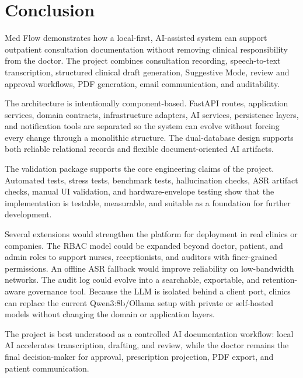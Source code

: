 \section{Conclusion}

Med Flow demonstrates how a local-first, AI-assisted system can support outpatient consultation documentation without removing clinical responsibility from the doctor. The project combines consultation recording, speech-to-text transcription, structured clinical draft generation, Suggestive Mode, review and approval workflows, PDF generation, email communication, and auditability.

The architecture is intentionally component-based. FastAPI routes, application services, domain contracts, infrastructure adapters, AI services, persistence layers, and notification tools are separated so the system can evolve without forcing every change through a monolithic structure. The dual-database design supports both reliable relational records and flexible document-oriented AI artifacts.

The validation package supports the core engineering claims of the project. Automated tests, stress tests, benchmark tests, hallucination checks, ASR artifact checks, manual UI validation, and hardware-envelope testing show that the implementation is testable, measurable, and suitable as a foundation for further development.

Several extensions would strengthen the platform for deployment in real clinics or companies. The RBAC model could be expanded beyond doctor, patient, and admin roles to support nurses, receptionists, and auditors with finer-grained permissions. An offline ASR fallback would improve reliability on low-bandwidth networks. The audit log could evolve into a searchable, exportable, and retention-aware governance tool. Because the LLM is isolated behind a client port, clinics can replace the current Qwen3:8b/Ollama setup with private or self-hosted models without changing the domain or application layers.

\begin{summarybox}
The project is best understood as a controlled AI documentation workflow: local AI accelerates transcription, drafting, and review, while the doctor remains the final decision-maker for approval, prescription projection, PDF export, and patient communication.
\end{summarybox}